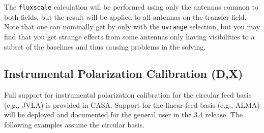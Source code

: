 {The {\tt fluxscale} calculation will be performed using only the
antennas common 
to both fields, but the result will be applied to all antennas on the
transfer field.  Note that one can nominally get by only with the
{\tt uvrange} selection, but you may find that you get strange
effects from some antennas only having visibilities to a subset of
the baselines and thus causing problems in the solving.

\subsection{Instrumental Polarization Calibration (D,X)}
\label{section:cal.solve.pol}

Full support for instrumental polarization calibration for the 
circular feed basis (e.g., JVLA) is provided in CASA.  Support for 
the linear feed basis (e.g., ALMA) will be deployed and documented
for the general user in the 3.4 release.  The following examples
assume the circular basis.

}
